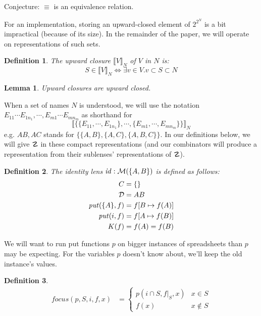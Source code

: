 \documentclass{article}
\newtheorem{lemma}{Lemma}
\newtheorem{definition}{Definition}
\begin{document}
Conjecture: $\equiv$ is an equivalence relation.

For an implementation, storing an upward-closed element of $2^{2^N}$ is a
bit impractical (because of its size). In the remainder of the paper, we
will operate on representations of such sets.

\newcommand{\upclose}[2]{\llbracket #1 \rrbracket_{#2}}
\begin{definition}
    The \emph{upward closure} $\upclose VN$ of $V$ in $N$ is:
    \[S \in \upclose VN \iff \exists v \in V. v \subset S \subset N\]
\end{definition}

\begin{lemma}
    Upward closures are upward closed.
\end{lemma}

When a set of names $N$ is understood, we will use the notation
$E_{11}\cdots E_{1n_1},\cdots,E_{m1}\cdots E_{mn_m}$ as shorthand for
\[\upclose{\{\{E_{11},\cdots,E_{1n_1}\},\cdots,\{E_{m1},\cdots,E_{mn_m}\}\}}N\]
e.g. $AB,AC$ stands for $\{\{A,B\},\{A,C\},\{A,B,C\}\}$. In our definitions
below, we will give $\danger$ in these compact representations (and our
combinators will produce a representation from their sublenses'
representations of $\danger$).

\newcommand{\id}{\mathit{id}}
\begin{definition}
    The identity lens $\id : \mlens{\{A,B\}}$ is defined as follows:
    \begin{align*}
        C &= \{\} \\
        \mathcal D &= AB \\
        \mathit{put}(\{A\},f) &= f[B \mapsto f(A)] \\
        \mathit{put}(i,f) &= f[A \mapsto f(B)] \\
        K(f) &= f(A) = f(B)
    \end{align*}
\end{definition}

\newcommand{\cond}[1]{\left\{\begin{array}{ll}#1\end{array}\right.}

\newcommand{\focus}{\mathit{focus}}
We will want to run put functions $p$ on bigger instances of spreadsheets
than $p$ may be expecting. For the variables $p$ doesn't know about, we'll
keep the old instance's values.
\begin{definition}
    \begin{align*}
        \focus(p,S,i,f,x) &= \cond{
            p(i \cap S,f|_S,x) & x \in S \\
            f(x) & x \notin S
        }
    \end{align*}
\end{definition}
\end{document}
